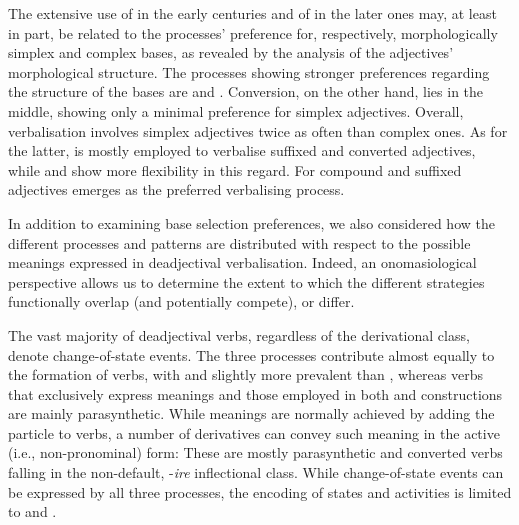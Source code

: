 \documentclass[output=paper,colorlinks,citecolor=brown]{langscibook}
\begin{document}
The extensive use of  in the early centuries and of  in the later ones may, at least in part, be related to the processes’ preference for, respectively, morphologically simplex and complex bases, as revealed by the analysis of the adjectives’ morphological structure. The processes showing stronger preferences regarding the structure of the bases are  and . Conversion, on the other hand, lies in the middle, showing only a minimal preference for simplex adjectives. Overall, verbalisation involves simplex adjectives twice as often than complex ones. As for the latter,  is mostly employed to verbalise suffixed and converted adjectives, while  and  show more flexibility in this regard. For compound and suffixed adjectives  emerges as the preferred verbalising process.

In addition to examining base selection preferences, we also considered how the different processes and patterns are distributed with respect to the possible meanings expressed in deadjectival verbalisation. Indeed, an onomasiological perspective allows us to determine the extent to which the different strategies functionally overlap (and potentially compete), or differ.

The vast majority of deadjectival verbs, regardless of the derivational class, denote change-of-state events. The three processes contribute almost equally to the formation of  verbs, with  and  slightly more prevalent than , whereas verbs that exclusively express  meanings and those employed in both  and  constructions are mainly parasynthetic. While  meanings are normally achieved by adding the  particle  to  verbs, a number of derivatives can convey such meaning in the active (i.e., non-pronominal) form: These are mostly parasynthetic and converted verbs  falling in the non-default, -\textit{ire} inflectional class. While change-of-state events can be expressed by all three processes, the encoding of states and activities is limited to   and  .
\end{document}
